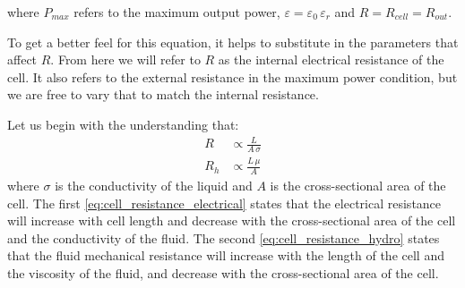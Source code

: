       where $P_{max}$ refers to the maximum output power, $\varepsilon=\varepsilon_{0}\,\varepsilon_{r}$ and $R=R_{cell}=R_{out}$.

      To get a better feel for this equation, it helps to substitute in the parameters that affect $R$.
      From here we will refer to $R$ as the internal electrical resistance of the cell.
      It also refers to the external resistance in the maximum power condition, but we are free to vary that to match the internal resistance.

      Let us begin with the understanding that:
      \begin{align}
          R & \propto \frac{L}{A\,\sigma}\label{eq:cell_resistance_electrical}\\
          R_{h} & \propto \frac{L\,\mu}{A}\label{eq:cell_resistance_hydro}
      \end{align}
      where $\sigma$ is the conductivity of the liquid and $A$ is the cross-sectional area of the cell.
      The first \cref{eq:cell_resistance_electrical} states that the electrical resistance will increase with cell length and decrease with the cross-sectional area of the cell and the conductivity of the fluid.
      The second \cref{eq:cell_resistance_hydro} states that the fluid mechanical resistance will increase with the length of the cell and the viscosity of the fluid, and decrease with the cross-sectional area of the cell.

